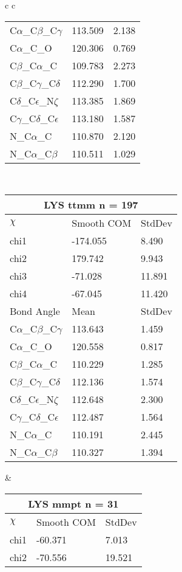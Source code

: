\begin{longtable}{ c c }
\begin{tabular}{ l l l }
  C$\alpha$\_C$\beta$\_C$\gamma$ & 113.509 & 2.138\\
  C$\alpha$\_C\_O & 120.306 & 0.769\\
  C$\beta$\_C$\alpha$\_C & 109.783 & 2.273\\
  C$\beta$\_C$\gamma$\_C$\delta$ & 112.290 & 1.700\\
  C$\delta$\_C$\epsilon$\_N$\zeta$ & 113.385 & 1.869\\
  C$\gamma$\_C$\delta$\_C$\epsilon$ & 113.180 & 1.587\\
  N\_C$\alpha$\_C & 110.870 & 2.120\\
  N\_C$\alpha$\_C$\beta$ & 110.511 & 1.029\\
  \bottomrule
  \end{tabular}
  \\
  \begin{tabular}{ l l l }
  \toprule
  \multicolumn{3}{c}{LYS \textbf{ttmm} n = 197} \\ \toprule
  $\chi$       & Smooth COM & StdDev \\ \midrule
  chi1 & -174.055 & 8.490 \\ 
  chi2 & 179.742 & 9.943 \\ 
  chi3 & -71.028 & 11.891 \\ 
  chi4 & -67.045 & 11.420 \\ \midrule
  Bond Angle   & Mean     & StdDev \\ \midrule
  C$\alpha$\_C$\beta$\_C$\gamma$ & 113.643 & 1.459\\
  C$\alpha$\_C\_O & 120.558 & 0.817\\
  C$\beta$\_C$\alpha$\_C & 110.229 & 1.285\\
  C$\beta$\_C$\gamma$\_C$\delta$ & 112.136 & 1.574\\
  C$\delta$\_C$\epsilon$\_N$\zeta$ & 112.648 & 2.300\\
  C$\gamma$\_C$\delta$\_C$\epsilon$ & 112.487 & 1.564\\
  N\_C$\alpha$\_C & 110.191 & 2.445\\
  N\_C$\alpha$\_C$\beta$ & 110.327 & 1.394\\
  \bottomrule
  \end{tabular}
  &
  \begin{tabular}{ l l l }
  \toprule
  \multicolumn{3}{c}{LYS \textbf{mmpt} n = 31} \\ \toprule
  $\chi$       & Smooth COM & StdDev \\ \midrule
  chi1 & -60.371 & 7.013 \\ 
  chi2 & -70.556 & 19.521 \\ 

\end{tabular}
\end{longtable}
